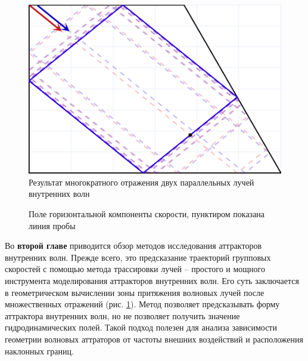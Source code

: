 \documentclass[utf8x]{G7-32} %
\begin{document}
\begin{figure}[h!]
    \centering
    \includegraphics[scale=1.1]{../Figs/RayTracing1.png}
    \caption{Результат многократного отражения двух параллельных лучей внутренних волн}
    \label{fig:RayTr}
\end{figure}

\begin{figure}[!ht]
    \centering
    \caption{Поле горизонтальной компоненты скорости, пунктиром показана линия пробы}
    \label{fig:attractorRes}
\end{figure}

Во \textbf{второй главе} приводится обзор методов исследования аттракторов внутренних волн. Прежде всего, это предсказание траекторий групповых скоростей с помощью метода трассировки лучей -- простого и мощного инструмента моделирования аттракторов внутренних волн. Его суть заключается в геометрическом вычислении зоны притяжения волновых лучей после множественных отражений (рис. \ref{fig:RayTr}). Метод позволяет предсказывать форму аттрактора внутренних волн, но не позволяет получить значение гидродинамических полей. 
Такой подход полезен для анализа зависимости геометрии волновых аттраторов от частоты внешних воздействий и расположения наклонных границ.
\end{document}
